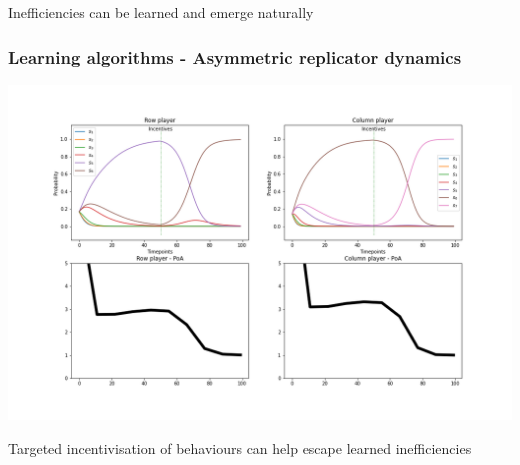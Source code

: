 \begin{frame}
    \centering
    \Huge{
    Inefficiencies can be learned and emerge naturally
    }
\end{frame}


\begin{frame}
    \frametitle{Learning algorithms - Asymmetric replicator dynamics}

    \includegraphics[scale=0.28]{Bin/ARD_penalty_game.png}
    
\end{frame}


\begin{frame}
    \centering
    \Huge{
    Targeted incentivisation of behaviours can help escape learned inefficiencies
    }
\end{frame}
